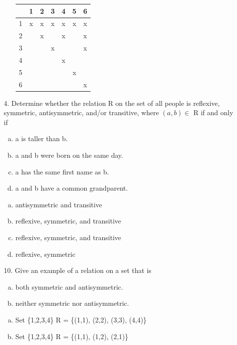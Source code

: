 \begin{itemize}
\begin{enumerate}[a.]
\begin{tabular}{r|*{6}{c}}
                          & 1 & 2 & 3 & 4 & 5 & 6 \\
                        \hline
                        1 & x & x & x & x & x & x \\
                        2 &   & x &   & x &   & x \\
                        3 &   &   & x &   &   & x \\
                        4 &   &   &   & x &   &   \\
                        5 &   &   &   &   & x &   \\
                        6 &   &   &   &   &   & x
                    \end{tabular}
          \end{enumerate}
    \item[4.]  Determine whether the relation R on the set of all people
          is reflexive, symmetric, antisymmetric, and/or transitive,
          where $(a, b) \in$ R if and only if
          \begin{enumerate}[a.]
              \item a is taller than b.
              \item a and b were born on the same day.
              \item a has the same first name as b.
              \item a and b have a common grandparent.
          \end{enumerate}
          \answer
          \begin{enumerate}[a.]
              \item antisymmetric and transitive
              \item reflexive, symmetric, and transitive
              \item reflexive, symmetric, and transitive
              \item reflexive, symmetric
          \end{enumerate}
    \item[10.] Give an example of a relation on a set that is
          \begin{enumerate}[a.]
              \item both symmetric and antisymmetric.
              \item neither symmetric nor antisymmetric.
          \end{enumerate}
          \answer
          \begin{enumerate}[a.]
              \item Set \{1,2,3,4\} R = \{(1,1), (2,2), (3,3), (4,4)\}
              \item Set \{1,2,3,4\} R = \{(1,1), (1,2), (2,1)\}
          \end{enumerate}
\end{itemize}



